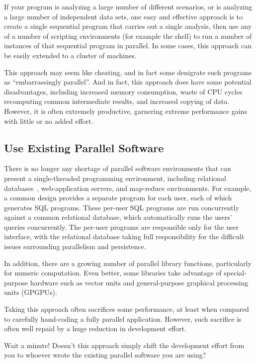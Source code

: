 If your program is analyzing a large number of different scenarios,
or is analyzing a large number of independent data sets, one easy
and effective approach is to create a single sequential program that
carries out a single analysis, then use any of a number of scripting
environments (for example the  shell) to run a number of
instances of that sequential program in parallel.
In some cases, this approach can be easily extended to a cluster of
machines.

This approach may seem like cheating, and in fact some denigrate such
programs as ``embarrassingly parallel''.
And in fact, this approach does have some potential disadvantages,
including increased memory consumption, waste of CPU cycles recomputing
common intermediate results, and increased copying of data.
However, it is often  extremely productive, garnering extreme performance
gains with little or no added effort.

\subsection{Use Existing Parallel Software}
\label{sec:intro:Use Existing Parallel Software}

There is no longer any shortage of parallel software environments that
can present a single-threaded programming environment,
including relational
databases~\cite{Date82},
web-application servers, and map-reduce environments.
For example, a common design provides a separate program for each
user, each of which generates SQL programs.
These per-user SQL programs are run concurrently against a common
relational database, which automatically runs the users' queries concurrently.
The per-user programs are responsible only for the user interface,
with the relational database taking full responsibility for the
difficult issues surrounding parallelism and persistence.

In addition, there are a growing number of parallel library functions,
particularly for numeric computation.
Even better, some libraries take advantage of special-purpose
hardware such as vector units and general-purpose graphical processing
units (GPGPUs).

Taking this approach often sacrifices some performance, at least when
compared to carefully hand-coding a fully parallel application.
However, such sacrifice is often well repaid by a huge reduction in
development effort.

\QuickQuiz{}
	Wait a minute!
	Doesn't this approach simply shift the development effort from
	you to whoever wrote the existing parallel software you are using?
 \QuickQuizEnd

